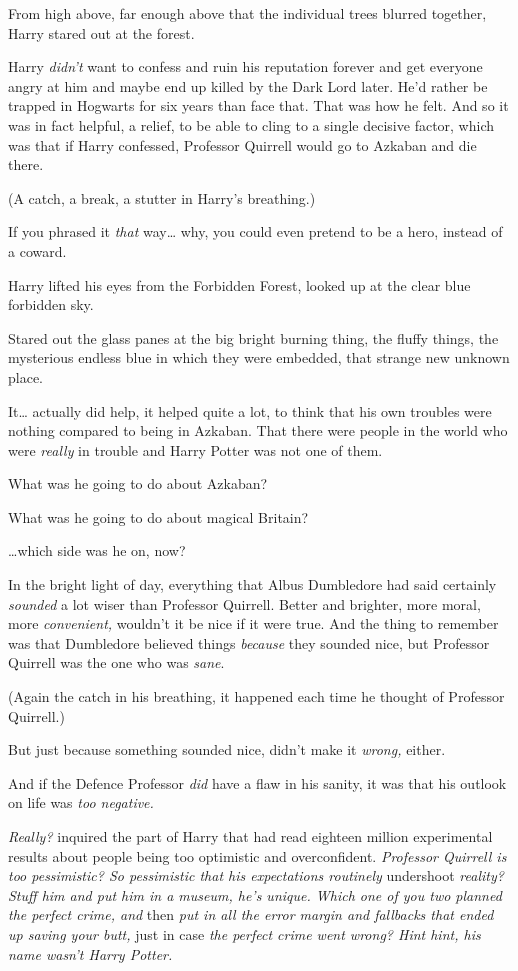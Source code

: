 From high above, far enough above that the individual trees blurred
together, Harry stared out at the forest.

Harry \emph{didn't} want to confess and ruin his reputation forever and
get everyone angry at him and maybe end up killed by the Dark Lord
later. He'd rather be trapped in Hogwarts for six years than face that.
That was how he felt. And so it was in fact helpful, a relief, to be
able to cling to a single decisive factor, which was that if Harry
confessed, Professor Quirrell would go to Azkaban and die there.

(A catch, a break, a stutter in Harry's breathing.)

If you phrased it \emph{that} way\ldots{} why, you could even pretend to
be a hero, instead of a coward.

Harry lifted his eyes from the Forbidden Forest, looked up at the clear
blue forbidden sky.

Stared out the glass panes at the big bright burning thing, the fluffy
things, the mysterious endless blue in which they were embedded, that
strange new unknown place.

It\ldots{} actually did help, it helped quite a lot, to think that his
own troubles were nothing compared to being in Azkaban. That there were
people in the world who were \emph{really} in trouble and Harry Potter
was not one of them.

What was he going to do about Azkaban?

What was he going to do about magical Britain?

\ldots{}which side was he on, now?

In the bright light of day, everything that Albus Dumbledore had said
certainly \emph{sounded} a lot wiser than Professor Quirrell. Better and
brighter, more moral, more \emph{convenient,} wouldn't it be nice if it
were true. And the thing to remember was that Dumbledore believed things
\emph{because} they sounded nice, but Professor Quirrell was the one who
was \emph{sane}.

(Again the catch in his breathing, it happened each time he thought of
Professor Quirrell.)

But just because something sounded nice, didn't make it \emph{wrong,}
either.

And if the Defence Professor \emph{did} have a flaw in his sanity, it
was that his outlook on life was \emph{too negative.}

\emph{Really?} inquired the part of Harry that had read eighteen million
experimental results about people being too optimistic and
overconfident. \emph{Professor Quirrell is too pessimistic? So
pessimistic that his expectations routinely} undershoot \emph{reality?
Stuff him and put him in a museum, he's unique. Which one of you two
planned the perfect crime, and} then \emph{put in all the error margin
and fallbacks that ended up saving your butt,} just in case \emph{the
perfect crime went wrong? Hint hint, his name wasn't Harry Potter.}


